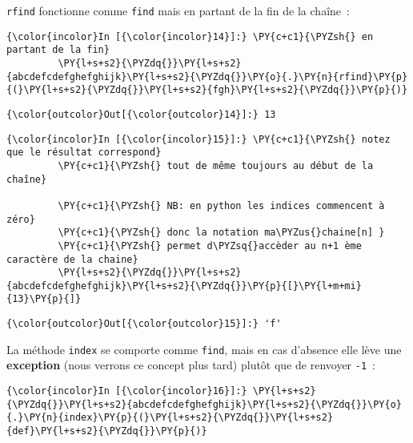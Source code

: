     \texttt{rfind} fonctionne comme \texttt{find} mais en partant de la fin
de la chaîne~:

    \begin{Verbatim}[commandchars=\\\{\},frame=single,framerule=0.3mm,rulecolor=\color{cellframecolor}]
{\color{incolor}In [{\color{incolor}14}]:} \PY{c+c1}{\PYZsh{} en partant de la fin}
         \PY{l+s+s2}{\PYZdq{}}\PY{l+s+s2}{abcdefcdefghefghijk}\PY{l+s+s2}{\PYZdq{}}\PY{o}{.}\PY{n}{rfind}\PY{p}{(}\PY{l+s+s2}{\PYZdq{}}\PY{l+s+s2}{fgh}\PY{l+s+s2}{\PYZdq{}}\PY{p}{)}
\end{Verbatim}


\begin{Verbatim}[commandchars=\\\{\},frame=single,framerule=0.3mm,rulecolor=\color{cellframecolor}]
{\color{outcolor}Out[{\color{outcolor}14}]:} 13
\end{Verbatim}
            
    \begin{Verbatim}[commandchars=\\\{\},frame=single,framerule=0.3mm,rulecolor=\color{cellframecolor}]
{\color{incolor}In [{\color{incolor}15}]:} \PY{c+c1}{\PYZsh{} notez que le résultat correspond}
         \PY{c+c1}{\PYZsh{} tout de même toujours au début de la chaîne}
         
         \PY{c+c1}{\PYZsh{} NB: en python les indices commencent à zéro}
         \PY{c+c1}{\PYZsh{} donc la notation ma\PYZus{}chaine[n] }
         \PY{c+c1}{\PYZsh{} permet d\PYZsq{}accèder au n+1 ème caractère de la chaine}
         \PY{l+s+s2}{\PYZdq{}}\PY{l+s+s2}{abcdefcdefghefghijk}\PY{l+s+s2}{\PYZdq{}}\PY{p}{[}\PY{l+m+mi}{13}\PY{p}{]}
\end{Verbatim}


\begin{Verbatim}[commandchars=\\\{\},frame=single,framerule=0.3mm,rulecolor=\color{cellframecolor}]
{\color{outcolor}Out[{\color{outcolor}15}]:} 'f'
\end{Verbatim}
            
    La méthode \texttt{index} se comporte comme \texttt{find}, mais en cas
d'absence elle lève une \textbf{exception} (nous verrons ce concept plus
tard) plutôt que de renvoyer \texttt{-1}~:

    \begin{Verbatim}[commandchars=\\\{\},frame=single,framerule=0.3mm,rulecolor=\color{cellframecolor}]
{\color{incolor}In [{\color{incolor}16}]:} \PY{l+s+s2}{\PYZdq{}}\PY{l+s+s2}{abcdefcdefghefghijk}\PY{l+s+s2}{\PYZdq{}}\PY{o}{.}\PY{n}{index}\PY{p}{(}\PY{l+s+s2}{\PYZdq{}}\PY{l+s+s2}{def}\PY{l+s+s2}{\PYZdq{}}\PY{p}{)}
\end{Verbatim}



